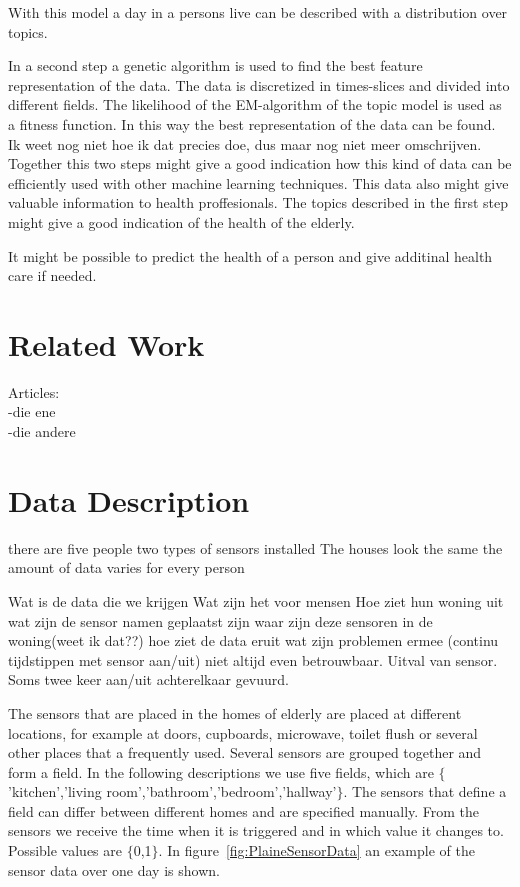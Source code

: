 \documentclass[11pt,a4paper]{article}
\begin{document}
With this model a day in a persons live can be described with a distribution over topics. %

In a second step a genetic algorithm is used to find the best feature representation of the data. The data is discretized in times-slices and divided into different fields. The likelihood of the EM-algorithm of the topic model is used as a fitness function. In this way the best representation of the data can be found.\\ 
Ik weet nog niet hoe ik dat precies doe, dus maar nog niet meer omschrijven.
Together this two steps might give a good indication how this kind of data can be efficiently used with other machine learning techniques.
This data also might give valuable information to health proffesionals. The topics described in the first step might give a good indication of the health of the elderly.

It might be possible to predict the health of a person and give additinal health care if needed.


\section{Related Work}
Articles:\\
-die ene\\
-die andere


\section{Data Description}
there are five people
two types of sensors installed
The houses look the same
the amount of data varies for every person


Wat is de data die we krijgen
Wat zijn het voor mensen
Hoe ziet hun woning uit
wat zijn de sensor namen geplaatst zijn
waar zijn deze sensoren in de woning(weet ik dat??)
hoe ziet de data eruit wat zijn problemen ermee (continu tijdstippen met sensor aan/uit)
niet altijd even betrouwbaar. Uitval van sensor. Soms twee keer aan/uit achterelkaar gevuurd.

The sensors that are placed in the homes of elderly are placed at different locations, for example at doors, cupboards, microwave, toilet flush or several other places that a frequently used. Several sensors are grouped together and form a field. In the following descriptions we use five fields, which are $\{$'kitchen','living room','bathroom','bedroom','hallway'$\}$. The sensors that define a field can differ between different homes and are specified manually.
From the sensors we receive the time when it is triggered and in which value it changes to. Possible values are $\{$0,1$\}$. In figure~\ref{fig:PlaineSensorData} an example of the sensor data over one day is shown.\\
\end{document}
